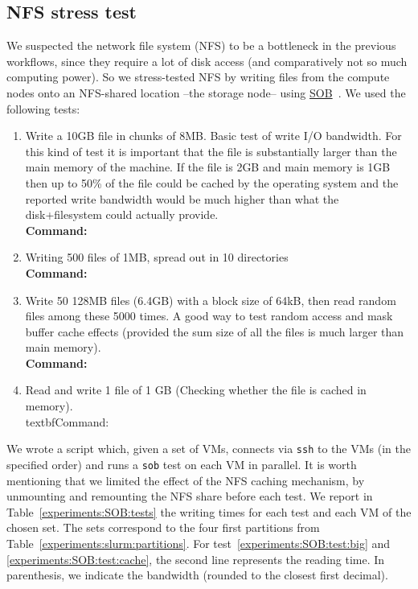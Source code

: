 \subsection{NFS stress test}
\label{experiments:NFS}

We suspected the network file system (NFS) to be a bottleneck in the
previous workflows, since they require a lot of disk access (and
comparatively not so much computing power). So we stress-tested NFS by
writing files from the compute nodes onto an NFS-shared location --the
storage node-- using
\href{https://www.pdc.kth.se/~pek/sob}{SOB}~\cite{sob}.
%
We used the following tests:

\begin{enumerate}
%
\item \label{experiments:SOB:test:big}%
Write a 10GB file in chunks of 8MB. Basic test of write I/O bandwidth.
For this kind of test it is important that the file is substantially
larger than the main memory of the machine. If the file is 2GB and main
memory is 1GB then up to 50\% of the file could be cached by the
operating system and the reported write bandwidth would be much higher
than what the disk+filesystem could actually provide.
%
\\\textbf{Command:}\ 
%
\item Writing 500 files of 1MB, spread out in 10 directories
%
\\\textbf{Command:}\ 
%
\item Write 50 128MB files (6.4GB) with a block size of 64kB, then read random
files among these 5000 times. A good way to test random access and mask
buffer cache effects (provided the sum size of all the files is much
larger than main memory).
%
\\\textbf{Command:}\ 
%
\item  \label{experiments:SOB:test:cache}%
 Read and write 1 file of 1 GB (Checking whether the file is cached in memory).
%
\\textbf{Command:}\ 
%
\end{enumerate}

We wrote a script which, given a set of VMs, connects via \texttt{ssh}
to the VMs (in the specified order) and runs a \texttt{sob} test on
each VM in parallel.
%
It is worth mentioning that we limited the effect of the NFS caching
mechanism, by unmounting and remounting the NFS share before each
test.
%
We report in Table~\ref{experiments:SOB:tests} the writing times for
each test and each VM of the chosen set. The sets correspond to the
four first partitions from
Table~\ref{experiments:slurm:partitions}. For
test~\ref{experiments:SOB:test:big} and
\ref{experiments:SOB:test:cache}, the second line represents the
reading time. In parenthesis, we indicate the bandwidth (rounded to
the closest first decimal).


